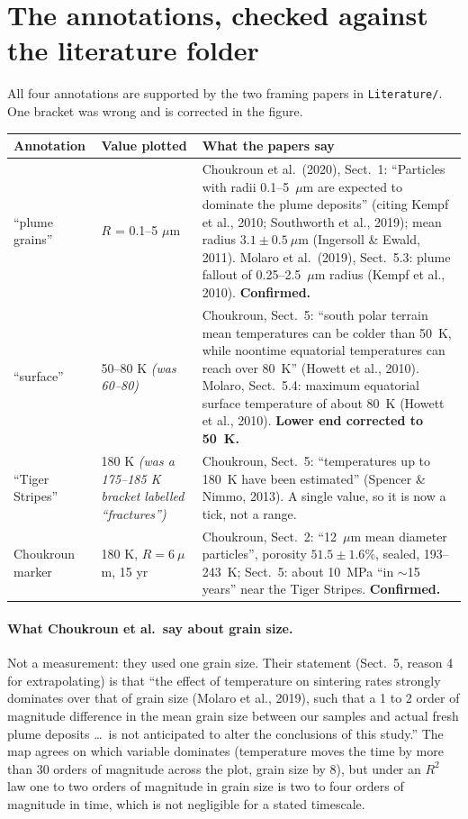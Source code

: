 \documentclass[11pt]{article}
\begin{document}
\section{The annotations, checked against the literature folder}\label{sec:lit}

All four annotations are supported by the two framing papers in
\texttt{Literature/}. One bracket was wrong and is corrected in the figure.

\begin{table}[h]\centering
\begin{tabular}{p{}p{}p{}}\toprule
Annotation & Value plotted & What the papers say\\\midrule
``plume grains'' & $R$ = 0.1--5 $\mu$m &
 Choukroun et al.\ (2020), Sect.~1: ``Particles with radii 0.1--5~$\mu$m are
 expected to dominate the plume deposits'' (citing Kempf et al., 2010;
 Southworth et al., 2019); mean radius $3.1 \pm 0.5~\mu$m (Ingersoll \& Ewald,
 2011). Molaro et al.\ (2019), Sect.~5.3: plume fallout of 0.25--2.5~$\mu$m
 radius (Kempf et al., 2010). \textbf{Confirmed.}\\
``surface'' & 50--80 K \emph{(was 60--80)} &
 Choukroun, Sect.~5: ``south polar terrain mean temperatures can be colder
 than 50~K, while noontime equatorial temperatures can reach over 80~K''
 (Howett et al., 2010). Molaro, Sect.~5.4: maximum equatorial surface
 temperature of about 80~K (Howett et al., 2010). \textbf{Lower end corrected
 to 50~K.}\\
``Tiger Stripes'' & 180 K \emph{(was a 175--185 K bracket labelled
 ``fractures'')} &
 Choukroun, Sect.~5: ``temperatures up to 180~K have been estimated''
 (Spencer \& Nimmo, 2013). A single value, so it is now a tick, not a
 range.\\
Choukroun marker & 180 K, $R = 6~\mu$m, 15 yr &
 Choukroun, Sect.~2: ``12~$\mu$m mean diameter particles'', porosity
 $51.5 \pm 1.6\%$, sealed, 193--243~K; Sect.~5: about 10~MPa ``in $\sim$15
 years'' near the Tiger Stripes. \textbf{Confirmed.}\\\bottomrule
\end{tabular}\end{table}

\paragraph{What Choukroun et al.\ say about grain size.} Not a measurement:
they used one grain size. Their statement (Sect.~5, reason 4 for
extrapolating) is that ``the effect of temperature on sintering rates strongly
dominates over that of grain size (Molaro et al., 2019), such that a 1 to 2
order of magnitude difference in the mean grain size between our samples and
actual fresh plume deposits \ldots\ is not anticipated to alter the
conclusions of this study.'' The map agrees on which variable dominates
(temperature moves the time by more than 30 orders of magnitude across the
plot, grain size by 8), but under an $R^{2}$ law one to two orders of magnitude
in grain size is two to four orders of magnitude in time, which is not
negligible for a stated timescale.
\end{document}
